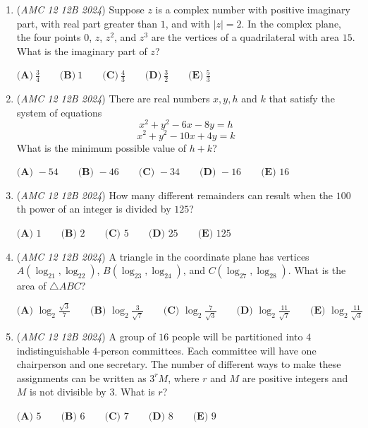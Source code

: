 \begin{enumerate}
 $\textbf{(A) }\frac{11}{45} \qquad \textbf{(B) }\frac{22}{45} \qquad \textbf{(C) }\frac{89}{180} \qquad \textbf{(D) }\frac{1}{2} \qquad \textbf{(E) }\frac{91}{180} \qquad$


	\item (\textit{AMC 12 12B 2024}) Suppose $z$ is a complex number with positive imaginary part, with real part greater than $1$, and with $|z| = 2$. In the complex plane, the four points $0$, $z$, $z^{2}$, and $z^{3}$ are the vertices of a quadrilateral with area $15$. What is the imaginary part of $z$?


 $\textbf{(A)}~\frac{3}{4}\qquad\textbf{(B)}~1\qquad\textbf{(C)}~\frac{4}{3}\qquad\textbf{(D)}~\frac{3}{2}\qquad\textbf{(E)}~\frac{5}{3}$


	\item (\textit{AMC 12 12B 2024}) There are real numbers $x,y,h$ and $k$ that satisfy the system of equations
 \[x^2 + y^2 - 6x - 8y = h\]
 \[x^2 + y^2 - 10x + 4y = k\]What is the minimum possible value of $h+k$?


 $\textbf{(A) }-54 \qquad \textbf{(B) }-46 \qquad \textbf{(C) }-34 \qquad \textbf{(D) }-16 \qquad \textbf{(E) }16 \qquad$


	\item (\textit{AMC 12 12B 2024}) How many different remainders can result when the $100$th power of an integer is divided by $125$?


 $\textbf{(A) }1 \qquad\textbf{(B) }2 \qquad\textbf{(C) }5 \qquad\textbf{(D) }25 \qquad\textbf{(E) }125 \qquad$


	\item (\textit{AMC 12 12B 2024}) A triangle in the coordinate plane has vertices $A(\log_21,\log_22)$, $B(\log_23,\log_24)$, and $C(\log_27,\log_28)$. What is the area of $\triangle ABC$?


 $\textbf{(A) }\log_2\frac{\sqrt3}7\qquad \textbf{(B) }\log_2\frac3{\sqrt7}\qquad \textbf{(C) }\log_2\frac7{\sqrt3}\qquad \textbf{(D) }\log_2\frac{11}{\sqrt7}\qquad \textbf{(E) }\log_2\frac{11}{\sqrt3}\qquad$


	\item (\textit{AMC 12 12B 2024}) A group of $16$ people will be partitioned into $4$ indistinguishable $4$-person committees. Each committee will have one chairperson and one secretary. The number of different ways to make these assignments can be written as $3^{r}M$, where $r$ and $M$ are positive integers and $M$ is not divisible by $3$. What is $r$?


 $\textbf{(A) }5 \qquad \textbf{(B) }6 \qquad \textbf{(C) }7 \qquad \textbf{(D) }8 \qquad \textbf{(E) }9 \qquad$



\end{enumerate}
